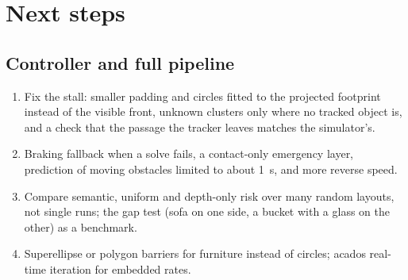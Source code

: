 \documentclass[10pt,a4paper]{article}
\begin{document}
\section{Next steps}
\subsection{Controller and full pipeline}
\begin{enumerate}
\item Fix the stall: smaller padding and circles fitted to the projected footprint instead of the visible front, unknown
clusters only where no tracked object is, and a check that the passage the tracker leaves matches the simulator's.
\item Braking fallback when a solve fails, a contact-only emergency layer, prediction of moving obstacles limited to about 1~s,
and more reverse speed.
\item Compare semantic, uniform and depth-only risk over many random layouts, not single runs; the gap test (sofa on one side,
a bucket with a glass on the other) as a benchmark.
\item Superellipse or polygon barriers for furniture instead of circles; acados real-time iteration for embedded rates.
\end{enumerate}
\end{document}
